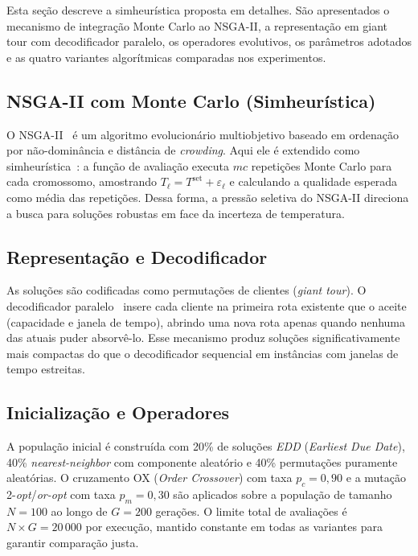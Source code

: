 \documentclass[a4paper,11pt]{article}
\begin{document}
Esta seção descreve a simheurística proposta em detalhes. São apresentados o mecanismo de integração Monte Carlo ao NSGA-II, a representação em giant tour com decodificador paralelo, os operadores evolutivos, os parâmetros adotados e as quatro variantes algorítmicas comparadas nos experimentos.

\subsection{NSGA-II com Monte Carlo (Simheurística)}

O NSGA-II~\citep{deb:2002} é um algoritmo evolucionário multiobjetivo baseado
em ordenação por não-domin\^ancia e dist\^ancia de \textit{crowding}.
Aqui ele é extendido como simheurística~\citep{juan:2015}: a função de avaliação
executa $mc$ repetições Monte Carlo para cada cromossomo, amostrando
$T_\ell = T^{\mathrm{set}} + \varepsilon_\ell$ e calculando a qualidade esperada
como média das repetições.
Dessa forma, a pressão seletiva do NSGA-II direciona a busca para soluções
robustas em face da incerteza de temperatura.

\subsection{Representação e Decodificador}

As soluções são codificadas como permutações de clientes (\textit{giant tour}).
O decodificador paralelo~\citep{nagata:2009} insere cada cliente na primeira
rota existente que o aceite (capacidade e janela de tempo), abrindo uma nova
rota apenas quando nenhuma das atuais puder absorv\^e-lo.
Esse mecanismo produz soluções significativamente mais compactas do que o
decodificador sequencial em inst\^ancias com janelas de tempo estreitas.

\subsection{Inicialização e Operadores}

A população inicial é construída com 20\% de soluções \textit{EDD}
(\textit{Earliest Due Date}), 40\% \textit{nearest-neighbor} com componente
aleatório e 40\% permutações puramente aleatórias.
O cruzamento OX (\textit{Order Crossover}) com taxa $p_c = 0{,}90$ e a mutação
2-\textit{opt}/\textit{or-opt} com taxa $p_m = 0{,}30$ são aplicados sobre a
população de tamanho $N = 100$ ao longo de $G = 200$ gerações.
O limite total de avaliações é $N \times G = 20\,000$ por execução,
mantido constante em todas as variantes para garantir comparação justa.
\end{document}
